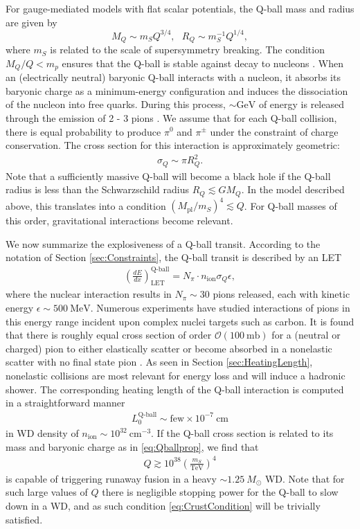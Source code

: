 \documentclass[twocolumn,showpacs,preprintnumbers,amsmath,amssymb,prd]{revtex4}
\newcommand{\OO}{\mathcal{O}}
\def\r{\right)}
\def\l{\left(}
\begin{document}
For gauge-mediated models with flat scalar potentials, the Q-ball mass and radius are given by
\begin{equation}
\label{eq:Qballprop}
M_Q \sim m_S Q^{3/4}, ~~~ R_Q \sim m_S^{-1} Q^{1/4},
\end{equation}
where $m_S$ is related to the scale of supersymmetry breaking.
The condition $M_Q/Q < m_p$ ensures that the Q-ball is stable against decay to nucleons \cite{Dine:2003ax}.
When an (electrically neutral) baryonic Q-ball interacts with a nucleon, it absorbs its baryonic charge as a minimum-energy configuration and induces the dissociation of the nucleon into free quarks.
During this process, $\sim \text{GeV}$ of energy is released through the emission of 2 - 3 pions \cite{Dine:2003ax}.
We assume that for each Q-ball collision, there is equal probability to produce $\pi^0$ and $\pi^\pm$ under the constraint of charge conservation.
The cross section for this interaction is approximately geometric:
\begin{align}
\sigma_Q \sim \pi R_Q^2.
\end{align}
Note that a sufficiently massive Q-ball will become a black hole if the Q-ball radius is less than the Schwarzschild radius $R_Q \lesssim G M_Q$.
In the model described above, this translates into a condition $(M_\text{pl}/m_S)^4 \lesssim Q$.
For Q-ball masses of this order, gravitational interactions become relevant.

We now summarize the explosiveness of a Q-ball transit.
According to the notation of Section \ref{sec:Constraints}, the Q-ball transit is described by an LET
\begin{align}
\left( \frac{d E}{d x} \right)^\text{Q-ball}_\text{LET} = N_\pi \cdot n_\text{ion} \sigma_Q \epsilon,
\end{align}
where the nuclear interaction results in $N_\pi \sim 30$ pions released, each with kinetic energy $\epsilon \sim 500 ~\text{MeV}$.
Numerous experiments have studied interactions of pions in this energy range incident upon complex nuclei targets such as carbon.
It is found that there is roughly equal cross section of order $\OO (100 ~\text{mb})$ for a (neutral or charged) pion to either elastically scatter or become absorbed in a nonelastic scatter with no final state pion \cite{Pionnuclear}.
As seen in Section \ref{sec:HeatingLength}, nonelastic collisions are most relevant for energy loss and will induce a hadronic shower.
The corresponding heating length of the Q-ball interaction is computed in a straightforward manner
\begin{align}
L_0^\text{Q-ball} \sim \text{few} \times 10^{-7} ~\text{cm}
\end{align}
in WD density of $n_\text{ion} \sim 10^{32} ~\text{cm}^{-3}$.
If the Q-ball cross section is related to its mass and baryonic charge as in \eqref{eq:Qballprop}, we find that 
\begin{align}
Q \gtrsim 10^{38} \l\frac{m_S}{\text{TeV}}\r^4
\end{align}
is capable of triggering runaway fusion in a heavy $\sim 1.25 ~M_{\odot}$ WD.
Note that for such large values of $Q$ there is negligible stopping power for the Q-ball to slow down in a WD, and as such condition \eqref{eq:CrustCondition} will be trivially satisfied.
\end{document}
